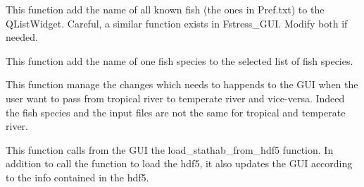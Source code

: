 \documentclass[letterpaper,10pt,english]{sphinxmanual}
\begin{document}
\begin{fulllineitems}
\begin{fulllineitems}
\label{\detokenize{index:src_GUI.stathab_GUI.StathabW.add_all_fish}}
This function add the name of all known fish (the ones in Pref.txt) to the QListWidget. Careful,
a similar function exists in Fstress\_GUI. Modify both if needed.

\end{fulllineitems}


\begin{fulllineitems}
\label{\detokenize{index:src_GUI.stathab_GUI.StathabW.add_fish}}
This function add the name of one fish species to the selected list of fish species.

\end{fulllineitems}


\begin{fulllineitems}
\label{\detokenize{index:src_GUI.stathab_GUI.StathabW.change_riv_type}}
This function manage the changes which needs to happends to the GUI when the user want to pass from
tropical river to temperate river and vice-versa. Indeed the fish species and the input files are not
the same for tropical and temperate river.

\end{fulllineitems}


\begin{fulllineitems}
\label{\detokenize{index:src_GUI.stathab_GUI.StathabW.init_iu}}
\end{fulllineitems}


\begin{fulllineitems}
\label{\detokenize{index:src_GUI.stathab_GUI.StathabW.load_from_hdf5_gui}}
This function calls from the GUI the load\_stathab\_from\_hdf5 function. In addition to call the function to load
the hdf5, it also updates the GUI according to the info contained in the hdf5.


\end{fulllineitems}
\end{fulllineitems}
\end{document}
